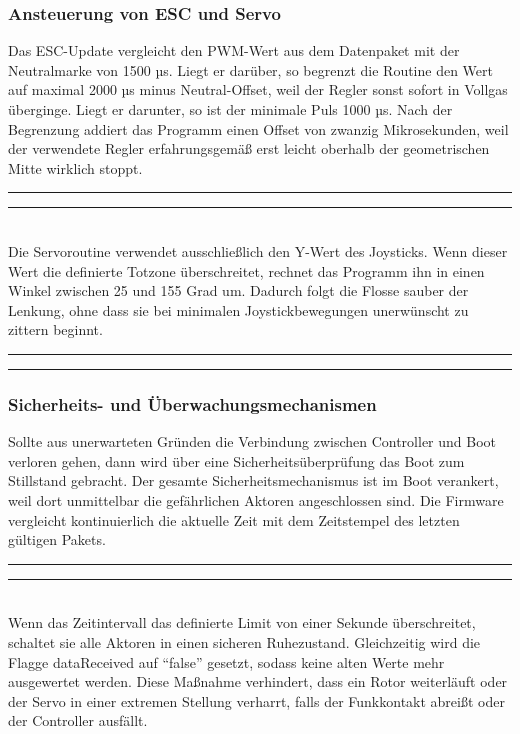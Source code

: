 \documentclass[a4paper,12pt]{article}
\begin{document}
\subsubsection{Ansteuerung von ESC und Servo}
\label{sec:Ansteuerung von ESC und Servo}

Das ESC-Update vergleicht den PWM-Wert aus dem Datenpaket mit der Neutralmarke von 1500 µs. Liegt er darüber, so begrenzt die Routine den Wert auf maximal 2000 µs minus Neutral-Offset, weil der Regler sonst sofort in Vollgas überginge. Liegt er darunter, so ist der minimale Puls 1000 µs. Nach der Begrenzung addiert das Programm einen Offset von zwanzig Mikrosekunden, weil der verwendete Regler erfahrungsgemäß erst leicht oberhalb der geometrischen Mitte wirklich stoppt.
\newline\noindent\rule{\linewidth}{0.4pt}  %

\noindent\rule{\linewidth}{0.4pt}\\[0.5em]  %
Die Servoroutine verwendet ausschließlich den Y-Wert des Joysticks. Wenn dieser Wert die definierte Totzone überschreitet, rechnet das Programm ihn in einen Winkel zwischen 25 und 155 Grad um. Dadurch folgt die Flosse sauber der Lenkung, ohne dass sie bei minimalen Joystickbewegungen unerwünscht zu zittern beginnt.
\newline\noindent\rule{\linewidth}{0.4pt}  %

\noindent\rule{\linewidth}{0.4pt}  %


\subsubsection*{Sicherheits- und Überwachungsmechanismen}
\label{sec:Sicherheits- und Überwachungsmechanismen}

Sollte aus unerwarteten Gründen die Verbindung zwischen Controller und Boot verloren gehen, dann wird über eine Sicherheitsüberprüfung das Boot zum Stillstand gebracht. Der gesamte Sicherheitsmechanismus ist im Boot verankert, weil dort unmittelbar die gefährlichen Aktoren angeschlossen sind. Die Firmware vergleicht kontinuierlich die aktuelle Zeit mit dem Zeitstempel des letzten gültigen Pakets. 
\newline\noindent\rule{\linewidth}{0.4pt}  %

\noindent\rule{\linewidth}{0.4pt}\\[0.5em]  %
Wenn das Zeitintervall das definierte Limit von einer Sekunde überschreitet, schaltet sie alle Aktoren in einen sicheren Ruhezustand. Gleichzeitig wird die Flagge dataReceived auf \enquote{false} gesetzt, sodass keine alten Werte mehr ausgewertet werden. Diese Maßnahme verhindert, dass ein Rotor weiterläuft oder der Servo in einer extremen Stellung verharrt, falls der Funkkontakt abreißt oder der Controller ausfällt.
\end{document}
